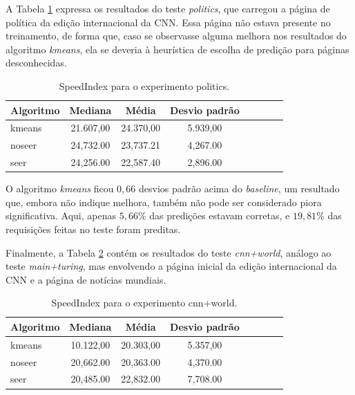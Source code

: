 \documentclass[10pt,twocolumn,letterpaper]{article}
\begin{document}
A Tabela \ref{tbl-cnn-politics} expressa os resultados do teste \emph{politics}, que carregou a página de política da edição internacional da CNN. Essa página não estava presente no treinamento, de forma que, caso se observasse alguma melhora nos resultados do algoritmo \emph{kmeans}, ela se deveria à heurística de escolha de predição para páginas desconhecidas.

\begin{table}
\begin{center}
\begin{tabular}{l*{6}{c}r}
\hline
Algoritmo & Mediana & Média & Desvio padrão \\
\hline
kmeans & 21.607,00 & 24.370,00 & 5.939,00 \\
noseer  & 24,732.00 & 23,737.21  & 4,267.00 \\
seer & 24,256.00 & 22,587.40 & 2,896.00 \\
\hline
\end{tabular}
\end{center}
\caption{SpeedIndex para o experimento politics.}
\label{tbl-cnn-politics}
\end{table}

O algoritmo \emph{kmeans} ficou $0,66$ desvios padrão acima do \emph{baseline}, um resultado que, embora não indique melhora, também não pode ser considerado piora significativa. Aqui, apenas $5,66 \%$ das predições estavam corretas, e $19,81 \%$ das requisições feitas no teste foram preditas.

Finalmente, a Tabela \ref{tbl-cnn-main-world} contém os resultados do teste \emph{cnn+world}, análogo ao teste \emph{main+turing}, mas envolvendo a página inicial da edição internacional da CNN e a página de notícias mundiais.

\begin{table}
\begin{center}
\begin{tabular}{l*{6}{c}r}
\hline
Algoritmo & Mediana & Média & Desvio padrão \\
\hline
kmeans & 10.122,00 & 20.303,00 & 5.357,00 \\
noseer  & 20,662.00 & 20,363.00 & 4,370.00 \\
seer & 20,485.00 & 22,832.00 & 7,708.00 \\
\hline
\end{tabular}
\end{center}
\caption{SpeedIndex para o experimento cnn+world.}
\label{tbl-cnn-main-world}
\end{table}
\end{document}
